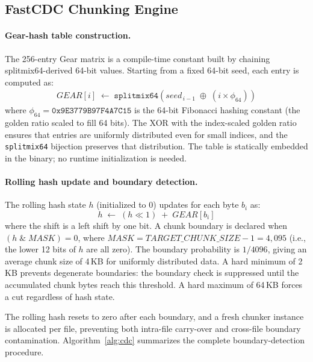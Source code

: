 \documentclass[5p,times]{elsarticle}
\begin{document}
\subsection{FastCDC Chunking Engine}
\label{sec:cdc}

\paragraph{Gear-hash table construction.}
The 256-entry Gear matrix is a compile-time constant built by
chaining splitmix64-derived 64-bit values.  Starting from a fixed 64-bit
seed, each entry is computed as:
\begin{align}
  \mathit{GEAR}[i] \;\leftarrow\;
    \texttt{splitmix64}\!\left(\mathit{seed}_{\,i-1}
      \;\oplus\;
      (i \times \phi_{64})\right)
  \label{eq:gear_matrix}
\end{align}
where $\phi_{64} = \texttt{0x9E3779B97F4A7C15}$ is the 64-bit
Fibonacci hashing constant (the golden ratio scaled to fill 64 bits).  The XOR with the
index-scaled golden ratio ensures that entries are uniformly distributed
even for small indices, and the \texttt{splitmix64} bijection preserves
that distribution.  The table is statically embedded in the binary;
no runtime initialization is needed.

\paragraph{Rolling hash update and boundary detection.}
The rolling hash state $h$ (initialized to 0) updates for each byte
$b_i$ as:
\begin{equation}
  h \;\leftarrow\; (h \ll 1) \;+\; \mathit{GEAR}[b_i]
  \label{eq:gear}
\end{equation}
where the shift is a left shift by one bit.  A chunk boundary is
declared when $(h \;\&\; \mathit{MASK}) = 0$, where
$\mathit{MASK} = \mathit{TARGET\_CHUNK\_SIZE} - 1 = 4{,}095$ (i.e., the
lower 12 bits of $h$ are all zero).  The boundary probability is
$1/4096$, giving an average chunk size of 4\,KB for uniformly distributed
data.  A hard minimum of 2\,KB prevents degenerate boundaries: the boundary
check is suppressed until the accumulated chunk bytes reach this threshold.
A hard maximum of 64\,KB forces a cut regardless of hash state.

The rolling hash resets to zero after each boundary, and a fresh chunker
instance is allocated per file, preventing both intra-file carry-over and
cross-file boundary contamination.
Algorithm~\ref{alg:cdc} summarizes the complete boundary-detection
procedure.
\end{document}
